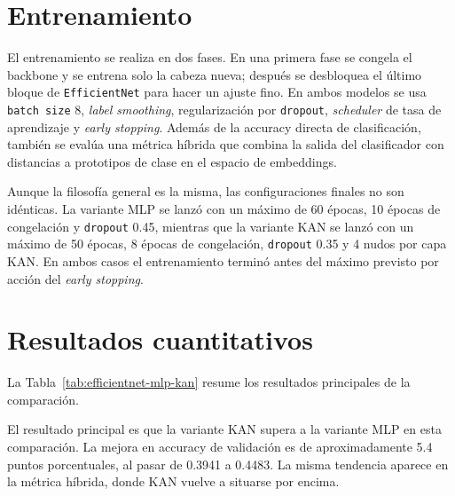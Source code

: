\documentclass[11pt,a4paper]{report}
\begin{document}
\section{Entrenamiento}

El entrenamiento se realiza en dos fases. En una primera fase se congela el backbone y se entrena solo la cabeza nueva; despu\'es se desbloquea el \'ultimo bloque de \texttt{EfficientNet} para hacer un ajuste fino. En ambos modelos se usa \texttt{batch size} 8, \textit{label smoothing}, regularizaci\'on por \texttt{dropout}, \textit{scheduler} de tasa de aprendizaje y \textit{early stopping}. Adem\'as de la accuracy directa de clasificaci\'on, tambi\'en se eval\'ua una m\'etrica h\'ibrida que combina la salida del clasificador con distancias a prototipos de clase en el espacio de embeddings.

Aunque la filosof\'ia general es la misma, las configuraciones finales no son id\'enticas. La variante MLP se lanz\'o con un m\'aximo de 60 \'epocas, 10 \'epocas de congelaci\'on y \texttt{dropout} 0.45, mientras que la variante KAN se lanz\'o con un m\'aximo de 50 \'epocas, 8 \'epocas de congelaci\'on, \texttt{dropout} 0.35 y 4 nudos por capa KAN. En ambos casos el entrenamiento termin\'o antes del m\'aximo previsto por acci\'on del \textit{early stopping}.

\section{Resultados cuantitativos}

La Tabla~\ref{tab:efficientnet-mlp-kan} resume los resultados principales de la comparaci\'on.

\begin{table}[H]
\centering
\caption{Comparaci\'on entre \texttt{EfficientNet + MLP} y \texttt{EfficientNet + KAN}.}
\label{tab:efficientnet-mlp-kan}
\end{table}

El resultado principal es que la variante KAN supera a la variante MLP en esta comparaci\'on. La mejora en accuracy de validaci\'on es de aproximadamente 5.4 puntos porcentuales, al pasar de 0.3941 a 0.4483. La misma tendencia aparece en la m\'etrica h\'ibrida, donde KAN vuelve a situarse por encima.
\end{document}
